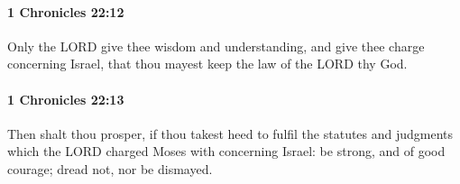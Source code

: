 		\paragraph{1 Chronicles 22:12} %
			\label{1CHRONICLES-22-12}

			Only the LORD give thee wisdom and understanding, and give thee charge concerning Israel, that thou mayest keep the law of the LORD thy God.


		\paragraph{1 Chronicles 22:13} %
			\label{1CHRONICLES-22-13}

			Then shalt thou prosper, if thou takest heed to fulfil the statutes and judgments which the LORD charged Moses with concerning Israel: be strong, and of good courage; dread not, nor be dismayed.



